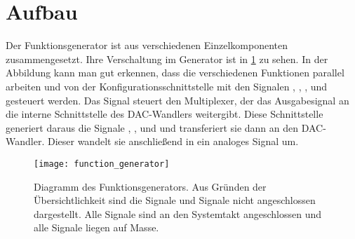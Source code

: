 \section{Aufbau}
Der Funktionsgenerator ist aus verschiedenen Einzelkomponenten zusammengesetzt.
Ihre Verschaltung im Generator ist in \cref{Concept:FuncGenDia} zu sehen.
In der Abbildung kann man gut erkennen, dass die verschiedenen Funktionen parallel arbeiten und von der Konfigurationsschnittstelle mit den Signalen , , ,  und  gesteuert werden.
Das Signal  steuert den Multiplexer, der das Ausgabesignal  an die interne Schnittstelle des DAC-Wandlers weitergibt.
Diese Schnittstelle generiert daraus die Signale , ,  und  und transferiert sie dann an den DAC-Wandler.
Dieser wandelt sie anschließend in ein analoges Signal um.

\begin{figure}[h] \centering
  \texttt{[image: function\_generator]}
  \caption{Diagramm des Funktionsgenerators. Aus Gründen der Übersichtlichkeit sind die  Signale und  Signale nicht angeschlossen dargestellt. Alle  Signale sind an den Systemtakt angeschlossen und alle  Signale liegen auf Masse.}  \label{Concept:FuncGenDia}
\end{figure}

